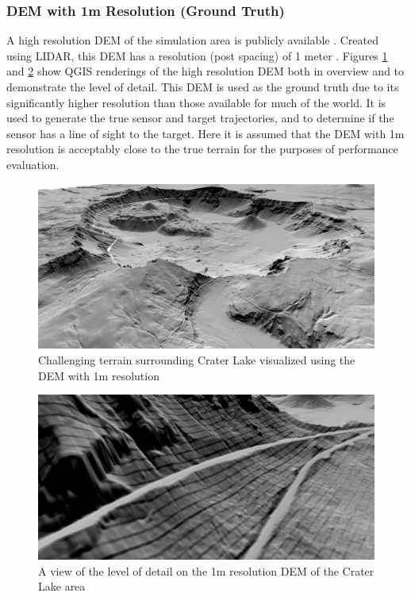 \documentclass[journal]{IEEEtran}
\begin{document}
\subsubsection{DEM with 1m Resolution (Ground Truth)} \label{dem1m}
A high resolution DEM of the simulation area is publicly available \cite{robinson2012high}. Created using LIDAR, this DEM has a resolution (post spacing) of 1 meter \cite{robinson2012high}. Figures \ref{fig:craterlake_1m} and \ref{fig:craterlake_1m_zoom} show QGIS \cite{qgis} renderings of the high resolution DEM both in overview and to demonstrate the level of detail. This DEM is used as the ground truth due to its significantly higher resolution than those available for much of the world. It is used to generate the true sensor and target trajectories, and to determine if the sensor has a line of sight to the target. Here it is assumed that the DEM with 1m resolution is acceptably close to the true terrain for the purposes of performance evaluation.

\begin{figure}[ht]
    \centering
    \includegraphics[scale=0.15]{craterlake_highres.png}
    \caption{Challenging terrain surrounding Crater Lake visualized using the DEM with 1m resolution}
    \label{fig:craterlake_1m}
\end{figure}

\begin{figure}[ht]
    \centering
    \includegraphics[scale=0.15]{craterlake_highres_zoom.png}
    \caption{A view of the level of detail on the 1m resolution DEM of the Crater Lake area}
    \label{fig:craterlake_1m_zoom}
\end{figure}
\end{document}
